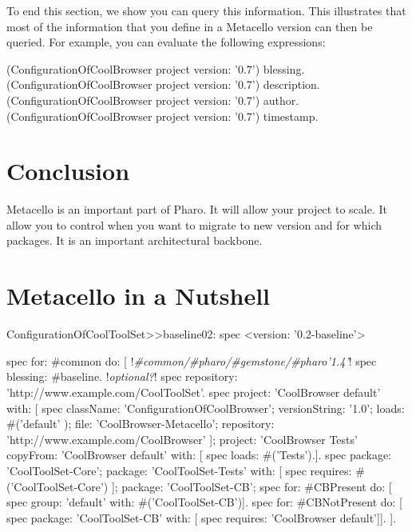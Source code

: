 \documentclass[a4paper,10pt,twoside]{book}
\begin{document}
To end this section, we show you can query this information. This illustrates that most of the information that you define in a Metacello version can then be queried. For example, you can evaluate the following expressions:

\begin{code}{}
(ConfigurationOfCoolBrowser project version: '0.7') blessing.
(ConfigurationOfCoolBrowser project version: '0.7') description.
(ConfigurationOfCoolBrowser project version: '0.7') author.
(ConfigurationOfCoolBrowser project version: '0.7') timestamp.
\end{code}


\section{Conclusion}
Metacello is an important part of Pharo. It will allow your project to scale. It allow you to control when you want to migrate to new version and for which packages. It is an important architectural backbone.


\newpage

\section{Metacello in a Nutshell}

\begin{footnotesize}
\begin{code}{}
ConfigurationOfCoolToolSet>>baseline02: spec 
       <version: '0.2-baseline'>     
       
       spec for: #common do: [                            !\emph{\#common/\#pharo/\#gemstone/\#pharo'1.4'}!     
              spec blessing: #baseline.					!\emph{optional?}!  
              spec repository: 'http://www.example.com/CoolToolSet'.
              spec project: 'CoolBrowser default' with: [
                            spec
                                   className: 'ConfigurationOfCoolBrowser';
                                   versionString: '1.0';
                                   loads: #('default' );
                                   file: 'CoolBrowser-Metacello';
                                   repository: 'http://www.example.com/CoolBrowser' ];
                     project: 'CoolBrowser Tests' 
                            copyFrom: 'CoolBrowser default' 
                            with: [ spec loads: #('Tests').].
              spec 
                     package: 'CoolToolSet-Core';
                     package: 'CoolToolSet-Tests' with: [ 
                            spec requires: #('CoolToolSet-Core') ];
                     package: 'CoolToolSet-CB';                     
              spec for: #CBPresent do: [
                     spec group: 'default' with: #('CoolToolSet-CB')].
              spec for: #CBNotPresent do: [
                     spec package: 'CoolToolSet-CB' with: [ spec requires: 'CoolBrowser default']].
          ].  
\end{code}\end{footnotesize} 
\end{document}
